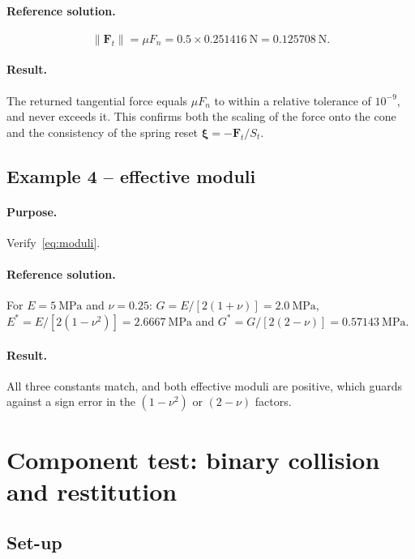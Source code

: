\paragraph{Reference solution.}
\begin{equation}
  \lVert\mathbf{F}_{t}\rVert = \mu F_{n}
  = 0.5\times\qty{0.251416}{\newton} = \qty{0.125708}{\newton}.
\end{equation}

\paragraph{Result.}  The returned tangential force equals $\mu F_{n}$ to within
a relative tolerance of $10^{-9}$, and never exceeds it.  This confirms both the
scaling of the force onto the cone and the consistency of the spring reset
$\boldsymbol{\xi}=-\mathbf{F}_{t}/S_{t}$.

\subsection{Example 4 -- effective moduli}

\paragraph{Purpose.}  Verify~\eqref{eq:moduli}.

\paragraph{Reference solution.}  For $E=\qty{5}{\mega\pascal}$ and $\nu=0.25$:
$G=E/[2(1+\nu)]=\qty{2.0}{\mega\pascal}$,
$E^{*}=E/[2(1-\nu^{2})]=\qty{2.6667}{\mega\pascal}$ and
$G^{*}=G/[2(2-\nu)]=\qty{0.57143}{\mega\pascal}$.

\paragraph{Result.}  All three constants match, and both effective moduli are
positive, which guards against a sign error in the $(1-\nu^{2})$ or $(2-\nu)$
factors.

\section{Component test: binary collision and restitution}
\label{sec:component-tests}

\subsection{Set-up}

